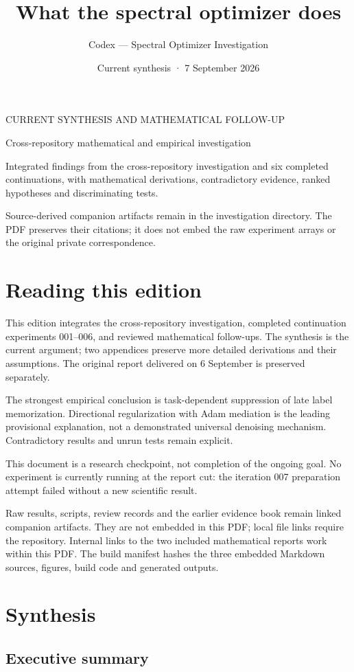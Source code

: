 \documentclass[
  british,
  10pt,
  a4paper,
]{article}
\title{What the spectral optimizer does}
\author{Codex --- Spectral Optimizer Investigation}
\date{Current synthesis · 7 September 2026}
\makeatletter
\renewcommand{\maketitle}{%
  \hypersetup{pageanchor=false}%
  \begin{titlepage}\thispagestyle{empty}
  \vspace*{1.2cm}
  {\large\sffamily\color{reportteal}CURRENT SYNTHESIS AND MATHEMATICAL FOLLOW-UP\par}
  \vspace{1.0cm}
  {\Huge\bfseries\color{reportink}\@title\par}
  \vspace{.8cm}
  {\Large Cross-repository mathematical and empirical investigation\par}
  \vspace{1.0cm}
  {\large\@author\par}
  \vspace{.35cm}
  {\large\@date\par}
  \vfill
  {\normalsize Integrated findings from the cross-repository investigation and six
  completed continuations, with mathematical derivations, contradictory
  evidence, ranked hypotheses and discriminating tests.\par}
  \vspace{.7cm}
  {\small Source-derived companion artifacts remain in the investigation
  directory. The PDF preserves their citations; it does not embed the raw
  experiment arrays or the original private correspondence.\par}
  \vspace*{.8cm}
  \end{titlepage}%
  \hypersetup{pageanchor=true}%
}
\makeatother
\begin{document}
\maketitle

{
\setcounter{tocdepth}{2}
\tableofcontents
}
\clearpage

\section*{Reading this edition}\label{reading-this-edition}

This edition integrates the cross-\allowbreak{}repository
investigatio\allowbreak{}n,\allowbreak{} completed continuation
experiments 001--006, and reviewed mathematical
follow-\allowbreak{}ups.\allowbreak{} The synthesis is the current
argument; two appendices preserve more detailed derivations and their
assumptions.\allowbreak{} The original report delivered on 6 September
is preserved separately.\allowbreak{}

The strongest empirical conclusion is task-\allowbreak{}dependent
suppression of late label memorization\allowbreak{}.\allowbreak{}
Directional regularization with Adam mediation is the leading
provisional explanation,\allowbreak{} not a demonstrated universal
denoising mechanism. Contradictory results and unrun tests remain
explicit.

This document is a research checkpoint,\allowbreak{} not completion of
the ongoing goal. No experiment is currently running at the report cut:
the iteration 007 preparation attempt failed without a new scientific
result.

Raw results, scripts, review records and the earlier evidence book
remain linked companion artifacts. They are not embedded in this PDF;
local file links require the repository.\allowbreak{} Internal links to
the two included mathematical reports work within this PDF. The build
manifest hashes the three embedded Markdown sources, figures, build code
and generated outputs.

\clearpage

\section{Synthesis}\label{synthesis}

\subsection{Executive summary}\label{synthesis--executive-summary}
\end{document}
